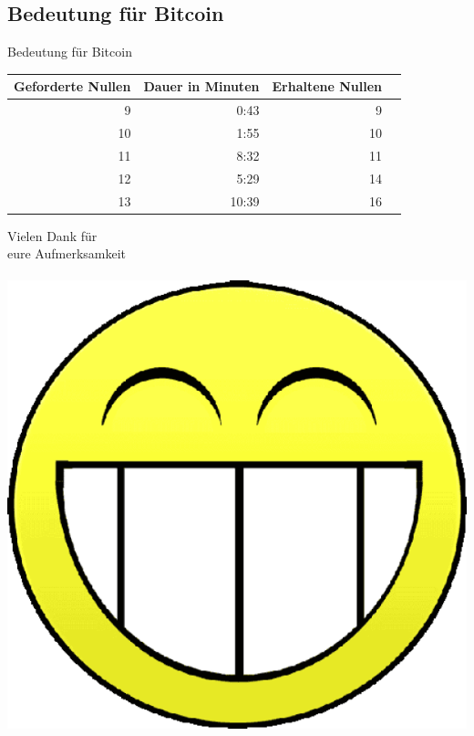 \documentclass{beamer}
\begin{document}
  \subsection{Bedeutung für Bitcoin}
    \begin{frame}{Bedeutung für Bitcoin}
      \begin{tabular}{rr|rr}
        Geforderte Nullen & Dauer in Minuten & Erhaltene Nullen \\
        \hline
         9 &  0:43 &  9 \\
        10 &  1:55 & 10 \\
        11 &  8:32 & 11 \\
        12 &  5:29 & 14 \\
        13 & 10:39 & 16
      \end{tabular}
    \end{frame}

\begin{frame}{}
  \begin{center}
    \begin{LARGE}
      Vielen Dank für\\
      eure Aufmerksamkeit\\
      ~\\
      \includegraphics[scale=0.2]{smilie.png}
    \end{LARGE}
  \end{center}
\end{frame}
\end{document}
